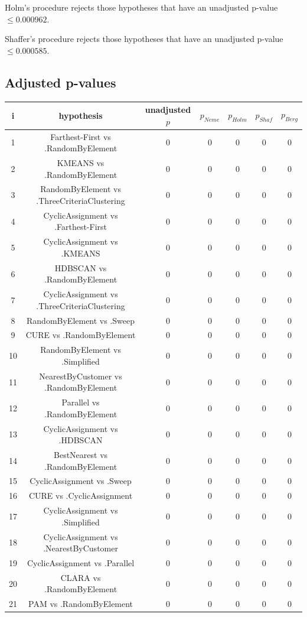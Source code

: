 \documentclass[a4paper,10pt]{article}
\begin{document}
\begin{landscape}
Holm's procedure rejects those hypotheses that have an unadjusted p-value $\le0.000962$.

Shaffer's procedure rejects those hypotheses that have an unadjusted p-value $\le0.000585$.

\pagebreak

\subsection{Adjusted p-values}

\begin{table}[!htp]
\centering\scriptsize
\begin{tabular}{ccccccc}
i&hypothesis&unadjusted $p$&$p_{Neme}$&$p_{Holm}$&$p_{Shaf}$&$p_{Berg}$\\
\hline1&Farthest-First vs .RandomByElement&0&0&0&0&0\\
2&KMEANS vs .RandomByElement&0&0&0&0&0\\
3&RandomByElement vs .ThreeCriteriaClustering&0&0&0&0&0\\
4&CyclicAssignment vs .Farthest-First&0&0&0&0&0\\
5&CyclicAssignment vs .KMEANS&0&0&0&0&0\\
6&HDBSCAN vs .RandomByElement&0&0&0&0&0\\
7&CyclicAssignment vs .ThreeCriteriaClustering&0&0&0&0&0\\
8&RandomByElement vs .Sweep&0&0&0&0&0\\
9&CURE vs .RandomByElement&0&0&0&0&0\\
10&RandomByElement vs .Simplified&0&0&0&0&0\\
11&NearestByCustomer vs .RandomByElement&0&0&0&0&0\\
12&Parallel vs .RandomByElement&0&0&0&0&0\\
13&CyclicAssignment vs .HDBSCAN&0&0&0&0&0\\
14&BestNearest vs .RandomByElement&0&0&0&0&0\\
15&CyclicAssignment vs .Sweep&0&0&0&0&0\\
16&CURE vs .CyclicAssignment&0&0&0&0&0\\
17&CyclicAssignment vs .Simplified&0&0&0&0&0\\
18&CyclicAssignment vs .NearestByCustomer&0&0&0&0&0\\
19&CyclicAssignment vs .Parallel&0&0&0&0&0\\
20&CLARA vs .RandomByElement&0&0&0&0&0\\
21&PAM vs .RandomByElement&0&0&0&0&0\\

\end{tabular}
\end{table}
\end{landscape}
\end{document}
